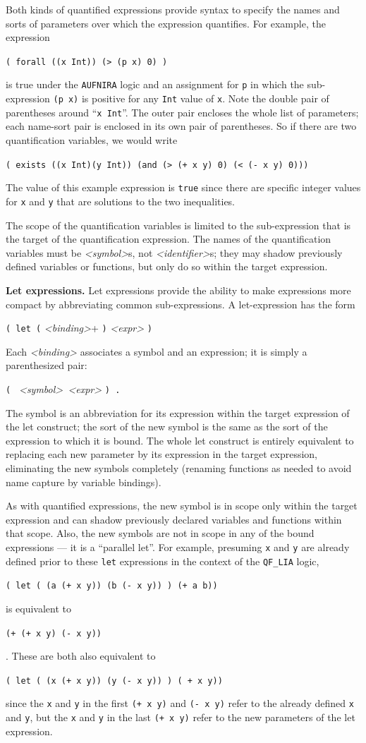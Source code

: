 \documentclass[12pt,oneside]{report}
\newcommand{\sym}{{\it <symbol>}}
\newcommand{\ID}{{\it <identifier>}}
\begin{document}
Both kinds of quantified expressions provide syntax to specify the names and sorts of parameters over which the
expression quantifies. For example, the expression \\
\centerline{\tt ( forall ((x Int)) (> (p x) 0) )}
is true under the {\tt AUFNIRA} logic and an assignment for {\tt p} in which 
the sub-expression {\tt (p x)} is positive for any {\tt Int} value of {\tt x}.
Note the double pair of parentheses around ``{\tt x Int}''.  The outer pair encloses the whole list of
parameters; each name-sort pair is enclosed in its own pair of parentheses.  So if there are two
quantification variables, we would write\\
\centerline{\tt ( exists ((x Int)(y Int)) (and (> (+ x y) 0) (< (- x y) 0)))}
The value of this example expression is {\tt true} since there are specific integer values for {\tt x} and {\tt y} that are solutions
to the two inequalities.

The scope of the quantification variables is limited to the sub-expression that is the target of the quantification expression.
The names of the quantification variables must be \sym s, not \ID s; they may shadow previously defined variables or functions, but only do so within
the target expression.

{\bf Let expressions.} Let expressions provide the ability to make expressions more compact by abbreviating common sub-expressions.  A let-expression has the form\\
\centerline{{\tt ( let (} {\it <binding>}+ {\tt )} {\it <expr>} {\tt )}}
Each {\it <binding>} associates a symbol and an expression; it is simply a parenthesized pair:\\
\centerline{ {\tt ( } {\it <symbol>\ <expr>} \tt{)} .}
The symbol is an abbreviation for its expression within the target
expression of the let construct; the sort of the new symbol is the same
as the sort of the expression to which it is bound. The whole let construct is entirely
equivalent to replacing each new parameter by its expression in the target expression,
eliminating the new symbols completely (renaming functions as needed to avoid name capture by variable bindings).

As with quantified expressions, the new symbol is in scope only within the target expression
and can shadow previously declared variables and functions within that scope. Also, the new symbols are not in scope in any of the bound expressions --- it is a ``parallel let''.
For example, presuming {\tt x} and {\tt y} are already defined prior to these {\tt let} expressions
in the context of the {\tt QF\_LIA} logic,\\
\centerline{\tt ( let ( (a (+ x y)) (b (- x y)) ) (+ a b))}
is equivalent to\\
\centerline{\tt (+ (+ x y) (- x y))}.
These are both also equivalent to \\
\centerline{\tt ( let ( (x (+ x y)) (y (- x y)) ) ( + x y))}
since the {\tt x} and {\tt y} in the first {\tt (+ x y)} and {\tt (- x y)} refer to the already defined
{\tt x} and {\tt y}, but the {\tt x} and {\tt y} in the last {\tt (+ x y)} refer to the new parameters of the
let expression.
\end{document}
